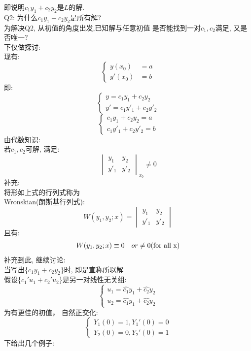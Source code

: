 即说明$c_1 y_1 + c_2 y_2$是$L$的解.\\[2em]
\hspace*{2em} Q2: 为什么$c_1 y_1 + c_2 y_2$是所有解?\\
为解决Q2, 从初值的角度出发,已知解与任意初值
是否能找到一对$c_1, c_2$满足, 又是否唯一?\\
下仅做探讨:\\
现有:
\[
\left\{
\begin{aligned}
    y(x_0) &= a \\
    y'(x_0) &= b
\end{aligned}
\right.
\]
即:
\[
\left\{
\begin{aligned}
    y = c_1 y_1 + c_2 y_2 \\
    y' = c_1 y'_1 + c_2 y'_2
\end{aligned}
\right.
\]
\[
\left\{
\begin{aligned}
    c_1 y_1 + c_2 y_2 = a \\
    c_1 y'_1 + c_2 y'_2 = b
\end{aligned}
\right.
\]
由代数知识:\\
若$c_1 , c_2$可解, 满足:
\[
\begin{vmatrix}
    y_1 & y_2 \\
    y'_1 & y'_2
\end{vmatrix}_{x_0}
\neq 0
\]
补充:\\
将形如上式的行列式称为\\
Wronskian(朗斯基行列式):
\[
W(y_1,y_2;x) = 
\begin{vmatrix}
    y_1 & y_2 \\
    y'_1 & y'_2
\end{vmatrix}
\]
且有:\\
\[ W(y_1,y_2;x) \equiv 0 \hspace*{1em} or \neq 0 \text{(for all x)} \]
补充到此, 继续讨论:\\
当写出\{$c_1y_1 + c_2y_2$\}时, 即是宣称所以解\\
假设\{$c_1'u_1 + c_2'u_2$\}是另一对线性无关组:
\[
\left\{
\begin{aligned}
    u_1 = \hat{c_1} y_1 + \hat{c_2} y_2  \\
    u_2 = \hat{c_1} y_1 + \hat{c_2} y_2
\end{aligned}
\right.
\]
为有更佳的初值， 自然正交化:
\[
\left\{
\begin{aligned}
    Y_1(0) = 1 ,  Y_1'(0) = 0 \\
    Y_2(0) = 0 ,  Y_2'(0) = 1
\end{aligned}
\right.
\]
下给出几个例子:\\
